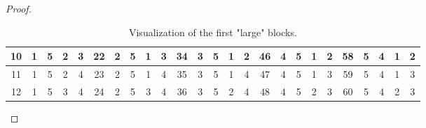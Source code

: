 \documentclass{scrartcl}
\theoremstyle{plain}
\begin{document}
\begin{proof}
\begin{table}[h]
{\begin{tabular}{||c | c c c c||c | c c c c||c | c c c c||c | c c c c||c | c c c c||}
				\hline
				10 & \cellcolor{-red!40!green}1 & \cellcolor{-red!40!green}5 & \cellcolor{-red!40!green}2 & \cellcolor{-red!40!green}3 & 22 & 2 & 5 & 1 & 3 & 34 & 3 & 5 & 1 & 2 & 46 & 4 & 5 & 1 & 2 & 58 & 5 & 4 & 1 & 2 \\ 
				\hline
				11 & \cellcolor{-red!40!green}1 & \cellcolor{-red!40!green}5 & \cellcolor{-red!40!green}2 & \cellcolor{-red!40!green}4 & 23 & 2 & 5 & 1 & 4 & 35 & 3 & 5 & 1 & 4 & 47 & 4 & 5 & 1 & 3 & 59 & 5 & 4 & 1 & 3 \\ 
				\hline
				12 & \cellcolor{-red!40!green}1 & \cellcolor{-red!40!green}5 & \cellcolor{-red!40!green}3 & \cellcolor{-red!40!green}4 & 24 & 2 & 5 & 3 & 4 & 36 & 3 & 5 & 2 & 4 & 48 & 4 & 5 & 2 & 3 & 60 & 5 & 4 & 2 & 3 \\ 
				\hline
			\end{tabular}%
		}
	\caption{Visualization of the first "large" blocks.}
	\end{table}


\end{proof}
\end{document}
